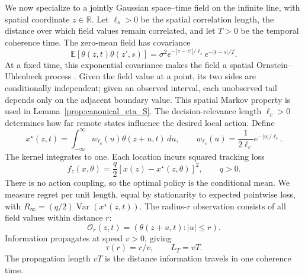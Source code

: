 \documentclass[11pt]{article}
\begin{document}
We now specialize to a jointly Gaussian space--time field on the infinite line,
with spatial coordinate $z\in\mathbb R$. Let $\ell_s>0$ be the spatial correlation length, the
distance over which field values remain correlated, and let $T>0$ be the
temporal coherence time. The zero-mean field has covariance
\begin{equation}
\mathbb E[\theta(z,t)\theta(z',s)]
=\sigma^2e^{-|z-z'|/\ell_s}e^{-|t-s|/T}.
\label{eq:canonical_space_time_covariance}
\end{equation}
At a fixed time, this exponential covariance makes the field a spatial
Ornstein--Uhlenbeck process \cite{williams2006gaussian}. Given the field
value at a point, its two sides are conditionally independent; given an
observed interval, each unobserved tail depends only on the adjacent boundary
value. This spatial Markov property is used in Lemma~\ref{prop:canonical_eta_S}.
The decision-relevance length $\ell_c>0$ determines how far remote states
influence the desired local action. Define
\begin{equation}
x^\star(z,t)=\int_{-\infty}^{\infty}w_{\ell_c}(u)\theta(z+u,t)\,du,
\qquad w_{\ell_c}(u)=\frac{1}{2\ell_c}e^{-|u|/\ell_c}.
\label{eq:canonical_target}
\end{equation}
The kernel integrates to one. Each location incurs squared tracking loss
\begin{equation}
f_z(x,\theta)=\frac q2[x(z)-x^\star(z,\theta)]^2,\qquad q>0.
\label{eq:canonical_tracking_cost}
\end{equation}
There is no action coupling, so the optimal policy is the conditional mean.
We measure regret per unit length, equal by stationarity to expected
pointwise loss, with $R_\infty=(q/2)\operatorname{Var}(x^\star(z,t))$.
The radius-$r$ observation consists of all field values within distance $r$:
\begin{equation}
\mathcal O_r(z,t)=(\theta(z+u,t):|u|\le r).
\label{eq:canonical_radius_observation}
\end{equation}
Information propagates at speed $v>0$, giving
\begin{equation}
\tau(r)=r/v,\qquad L_T=vT.
\label{eq:temporal_propagation_length}
\end{equation}
The propagation length $vT$ is the distance information travels in one
coherence time.
\end{document}
